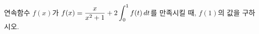 연속함수 $f(x)$가 $f(x)=\dfrac{x}{x^2+1}+2\displaystyle\int_{0}^{1}f(t)\mkern3mu dt$를 만족시킬 때, $f(1)$의 값을 구하시오.
